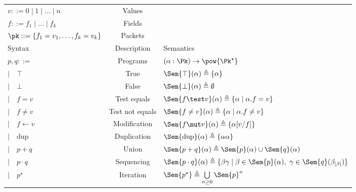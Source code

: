 \begin{figure}
  \renewcommand{\arraystretch}{1.1}
  \begin{tabular}{lcl}
      $v ::= 0 \mid 1 \mid \ldots \mid n$ & Values & \\
      $f ::= f_1 \mid \ldots \mid f_k$ & Fields & \\
      $\pk ::= \{f_1 = v_1, \ldots, f_k = v_k\}$ & Packets & \\
      \hline
      Syntax & Description & Semantics \\
      \hline
      $p,q ::= $ & Programs & $(\alpha : \Pk) \to \pow{\Pk^\star}$ \\
      \qquad$\mid\quad \top$ & True & $\Sem{\top}(\alpha) \triangleq \{ \alpha \}$ \\
      \qquad$\mid\quad \bot$ & False & $\Sem{\bot}(\alpha) \triangleq \emptyset$ \\
      \qquad$\mid\quad f = v$ & Test equals & $\Sem{f \test v}(\alpha) \triangleq \{ \alpha \mid \alpha.f = v \}$ \\
      \qquad$\mid\quad f \neq v$ & Test not equals & $\Sem{f \neq v}(\alpha) \triangleq \{ \alpha \mid \alpha.f \neq v \}$ \\
      \qquad$\mid\quad f \gets v$ & Modification & $\Sem{f \mut v}(\alpha) \triangleq \{ \alpha[v/f] \}$ \\
      \qquad$\mid\quad \text{dup}$ & Duplication & $\Sem{\text{dup}}(\alpha) \triangleq \{ \alpha\alpha \}$ \\
      \qquad$\mid\quad p + q$ & Union & $\Sem{p+q}(\alpha) \triangleq \Sem{p}(\alpha) \cup \Sem{q}(\alpha)$ \\
      \qquad$\mid\quad p \cdot q$ & Sequencing & $\Sem{p\cdot q}(\alpha) \triangleq \{ \beta\gamma \mid \beta \in \Sem{p}(\alpha),\ \gamma \in \Sem{q}(\beta_{|\beta|}) \}$ \\
      \qquad$\mid\quad p^\star$ & Iteration & $\Sem{p^\star} \triangleq \bigcup\limits_{n\geq 0} \Sem{p}^n$ \\
  \end{tabular}
  \renewcommand{\arraystretch}{1.0}
\end{figure}

